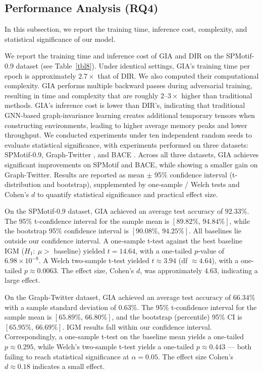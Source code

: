 \documentclass[a4paper,fleqn]{cas-dc}
\begin{document}
\subsection{Performance Analysis (RQ4)}
{\color{blue}In this subsection, we report the training time, inference cost, complexity, and statistical significance of our model.

We report the training time and inference cost of GIA and DIR on the SPMotif-0.9 dataset (see Table~\ref{tbl8}). Under identical settings, GIA's training time per epoch is approximately \(2.7\times\) that of DIR. We also computed their computational complexity. GIA performs multiple backward passes during adversarial training, resulting in time and complexity that are roughly \(2\text{--}3\times\) higher than traditional methods. GIA's inference cost is lower than DIR's, indicating that traditional GNN-based graph-invariance learning creates additional temporary tensors when constructing environments, leading to higher average memory peaks and lower throughput. We conducted experiments under ten independent random seeds to evaluate statistical significance, with experiments performed on three datasets: SPMotif-0.9, Graph-Twitter \cite{dong2014adaptive}, and BACE \cite{hu2020open}. Across all three datasets, GIA achieves significant improvements on SPMotif and BACE, while showing a smaller gain on Graph-Twitter. Results are reported as mean \(\pm\) 95\% confidence interval (t-distribution and bootstrap), supplemented by one-sample / Welch tests and Cohen's \(d\) to quantify statistical significance and practical effect size.

On the SPMotif-0.9 dataset, GIA achieved an average test accuracy of \(92.33\%\). The 95\% t-confidence interval for the sample mean is \([89.82\%,\,94.84\%]\), while the bootstrap 95\% confidence interval is \([90.08\%,\,94.25\%]\). All baselines lie outside our confidence interval. A one-sample t-test against the best baseline IGM (\(H_1:\ \mu>\) baseline) yielded \(t=14.64\), with a one-tailed \(p\)-value of \(6.98\times10^{-8}\). A Welch two-sample t-test yielded \(t\approx 3.94\) (df \(\approx 4.64\)), with a one-tailed \(p\approx 0.0063\). The effect size, Cohen's \(d\), was approximately \(4.63\), indicating a large effect.


On the Graph-Twitter \cite{dong2014adaptive} dataset, GIA achieved an average test accuracy of \(66.34\%\) with a sample standard deviation of \(0.63\%\). The 95\% t-confidence interval for the sample mean is \([65.89\%,\,66.80\%]\), and the bootstrap (percentile) 95\% CI is \([65.95\%,\,66.69\%]\). IGM results fall within our confidence interval. Correspondingly, a one-sample t-test on the baseline mean yields a one-tailed \(p\approx 0.295\), while Welch's two-sample t-test yields a one-tailed \(p\approx 0.443\) — both failing to reach statistical significance at \(\alpha=0.05\). The effect size Cohen's \(d\approx 0.18\) indicates a small effect.

}
\end{document}
